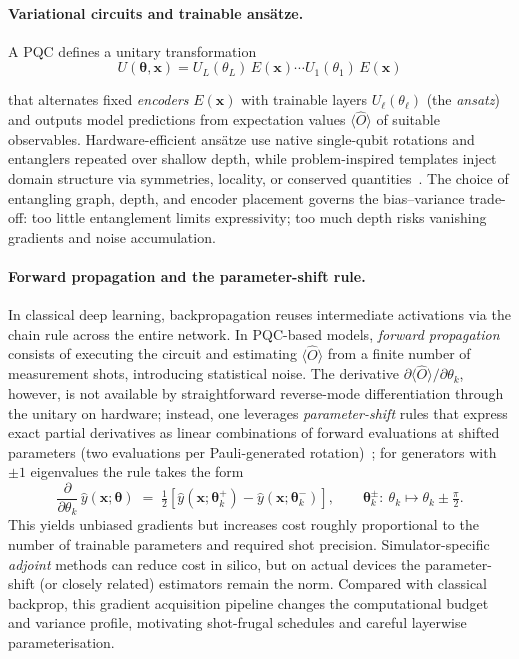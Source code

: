 \paragraph{Variational circuits and trainable ans\"atze.}
A PQC defines a unitary transformation 
\begin{equation*}
U(\boldsymbol{\theta},\mathbf{x})=U_L(\theta_L)\,E(\mathbf{x})\cdots U_1(\theta_1)\,E(\mathbf{x})
\end{equation*}

\noindent that alternates fixed \emph{encoders} $E(\mathbf{x})$ with trainable layers $U_\ell(\theta_\ell)$ (the \emph{ansatz}) and outputs model predictions from expectation values $\langle \hat{O}\rangle$ of suitable observables. Hardware-efficient ans\"atze use native single-qubit rotations and entanglers repeated over shallow depth, while problem-inspired templates inject domain structure via symmetries, locality, or conserved quantities~\cite{Benedetti2019,cerezo2021}. The choice of entangling graph, depth, and encoder placement governs the bias--variance trade-off: too little entanglement limits expressivity; too much depth risks vanishing gradients and noise accumulation.


\paragraph{Forward propagation and the parameter-shift rule.}
In classical deep learning, backpropagation reuses intermediate activations via the chain rule across the entire network. In PQC-based models, \emph{forward propagation} consists of executing the circuit and estimating $\langle \hat{O}\rangle$ from a finite number of measurement shots, introducing statistical noise. The derivative $\partial \langle \hat{O}\rangle / \partial \theta_k$, however, is not available by straightforward reverse-mode differentiation through the unitary on hardware; instead, one leverages \emph{parameter-shift} rules that express exact partial derivatives as linear combinations of forward evaluations at shifted parameters (two evaluations per Pauli-generated rotation)~\cite{Mitarai2018,Schuld2019Grad}; for generators with $\pm 1$ eigenvalues the rule takes the form
\begin{equation}
\frac{\partial}{\partial \theta_k}\,\hat{y}(\mathbf{x};\boldsymbol{\theta})
\;=\; \tfrac{1}{2}\!\left[
\hat{y}\!\left(\mathbf{x};\boldsymbol{\theta}_{k}^{+}\right)
-\hat{y}\!\left(\mathbf{x};\boldsymbol{\theta}_{k}^{-}\right)\right],
\qquad
\boldsymbol{\theta}_{k}^{\pm}:\ \theta_k \mapsto \theta_k \pm \tfrac{\pi}{2}.
\label{eq:psr}
\end{equation}
This yields unbiased gradients but increases cost roughly proportional to the number of trainable parameters and required shot precision. Simulator-specific \emph{adjoint} methods can reduce cost in silico, but on actual devices the parameter-shift (or closely related) estimators remain the norm. Compared with classical backprop, this gradient acquisition pipeline changes the computational budget and variance profile, motivating shot-frugal schedules and careful layerwise parameterisation.


